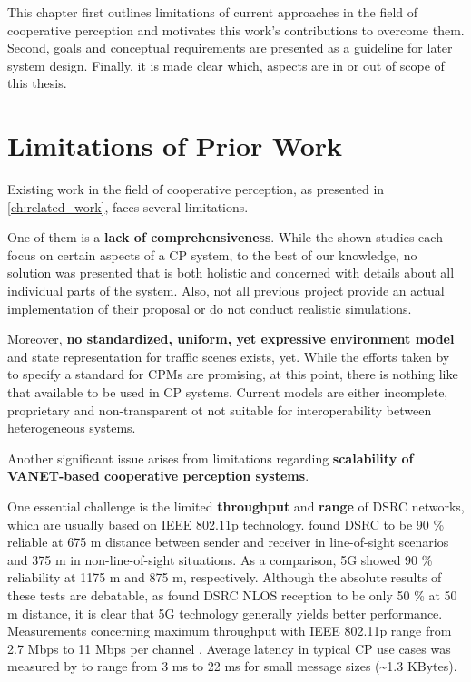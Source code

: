 This chapter first outlines limitations of current approaches in the field of cooperative perception and motivates this work's contributions to overcome them. Second, goals and conceptual requirements are presented as a guideline for later system design. Finally, it is made clear which, aspects are in or out of scope of this thesis.

\section{Limitations of Prior Work}
\label{sec:problem_analysis:limitations_of_prior_work}

Existing work in the field of cooperative perception, as presented in \cref{ch:related_work}, faces several limitations.
\par
\bigskip

One of them is a \textbf{lack of comprehensiveness}. While the shown studies each focus on certain aspects of a CP system, to the best of our knowledge, no solution was presented that is both holistic and concerned with details about all individual parts of the system. Also, not all previous project provide an actual implementation of their proposal or do not conduct realistic simulations.
\par
\bigskip

Moreover, \textbf{no standardized, uniform, yet expressive environment model} and state representation for traffic scenes exists, yet. While the efforts taken by \cite{EuropeanTelecommunicationsStandardsInstituteETSI2019} to specify a standard for CPMs are promising, at this point, there is nothing like that available to be used in CP systems. Current models are either incomplete, proprietary and non-transparent ot not suitable for interoperability between heterogeneous systems. 
\par
\bigskip

Another significant issue arises from limitations regarding \textbf{scalability of VANET-based cooperative perception systems}.

One essential challenge is the limited \textbf{throughput} and \textbf{range} of DSRC networks, which are usually based on IEEE 802.11p technology. \cite{5GAutomotiveAssociation2018} found DSRC to be 90 \% reliable at 675 m distance between sender and receiver in line-of-sight scenarios and 375 m in non-line-of-sight situations. As a comparison, 5G showed 90 \% reliability at 1175 m and 875 m, respectively. Although the absolute results of these tests are debatable, as \cite{Mangel2011} found DSRC NLOS reception to be only 50 \% at 50 m distance, it is clear that 5G technology generally yields better performance. Measurements concerning maximum throughput with IEEE 802.11p range from 2.7 Mbps to 11 Mbps per channel \cite{Chen2016, Wang2013}. Average latency in typical CP use cases was measured by \cite{Rauch2011} to range from 3 ms to 22 ms for small message sizes (\textasciitilde 1.3 KBytes).

